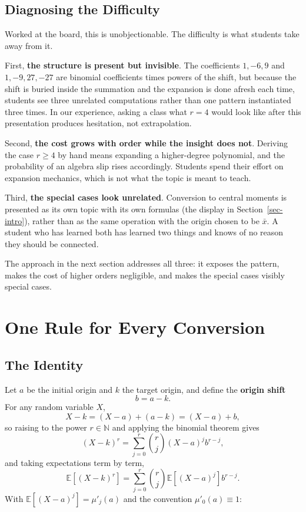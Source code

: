 \documentclass[
  12pt]{article}
\begin{document}
\subsection{Diagnosing the Difficulty}

Worked at the board, this is unobjectionable. The difficulty is what students take away from it.

First, \textbf{the structure is present but invisible}. The coefficients $1, -6, 9$ and $1, -9, 27, -27$ are binomial coefficients times powers of the shift, but because the shift is buried inside the summation and the expansion is done afresh each time, students see three unrelated computations rather than one pattern instantiated three times. In our experience, asking a class what $r=4$ would look like after this presentation produces hesitation, not extrapolation.

Second, \textbf{the cost grows with order while the insight does not}. Deriving the case $r \ge 4$ by hand means expanding a higher-degree polynomial, and the probability of an algebra slip rises accordingly. Students spend their effort on expansion mechanics, which is not what the topic is meant to teach.

Third, \textbf{the special cases look unrelated}. Conversion to central moments is presented as its own topic with its own formulas (the display in Section~\ref{sec-intro}), rather than as the same operation with the origin chosen to be $\bar{x}$. A student who has learned both has learned two things and knows of no reason they should be connected.

The approach in the next section addresses all three: it exposes the pattern, makes the cost of higher orders negligible, and makes the special cases visibly special cases.

\section{One Rule for Every Conversion}\label{sec-rule}

\subsection{The Identity}

Let $a$ be the initial origin and $k$ the target origin, and define the \textbf{origin shift}
\[
b = a - k.
\]
For any random variable $X$,
\[
X - k = (X - a) + (a - k) = (X - a) + b,
\]
so raising to the power $r \in \mathbb{N}$ and applying the binomial theorem gives
\[
(X - k)^r = \sum_{j=0}^r \binom{r}{j} (X - a)^j b^{r-j},
\]
and taking expectations term by term,
\[
\mathbb{E}[(X - k)^r] = \sum_{j=0}^r \binom{r}{j} \mathbb{E}[(X - a)^j] b^{r-j}.
\]
With $\mathbb{E}[(X - a)^j] = \mu'_j(a)$ and the convention $\mu'_0(a) \equiv 1$:
\end{document}
